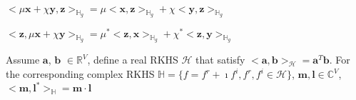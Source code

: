 \documentclass[12pt, draftclsnofoot, onecolumn]{IEEEtran}
\begin{document}
\begin{spacing}{2}
\begin{Property}
$<\mu\mathbf{x}+\chi\mathbf{y},\mathbf{z}>_{\mathbb{H}_{g}}=\mu<\mathbf{x},\mathbf{z}>_{\mathbb{H}_{g}}+\chi<\mathbf{y},\mathbf{z}>_{\mathbb{H}_{g}}$
\label{CHSProperty2}
\end{Property}

\begin{Property}
$<\mathbf{z}, \mu\mathbf{x}+\chi\mathbf{y}>_{\mathbb{H}_{g}}=\mu^{*}<\mathbf{z},\mathbf{x}>_{\mathbb{H}_{g}}+\chi^{*}<\mathbf{z}, \mathbf{y}>_{\mathbb{H}_{g}}$
\label{CHSProperty3}
\end{Property}

\begin{Lemma}
Assume $\mathbf{a}$, $\mathbf{b}$ $\in \mathbb{R}^{V}$, define a real RKHS $\mathcal{H}$ that satisfy $<\mathbf{a}, \mathbf{b}>_{\mathcal{H}}=\mathbf{a}^{T}\mathbf{b}$. For the corresponding complex RKHS $\mathbb{H}=\{f=f^{r}+\imath f^{i}, f^{r}, f^{i}\in \mathcal{H}\}$, $\mathbf{m}, \mathbf{l}\in \mathbb{C}^{V}$,
$<\mathbf{m},\mathbf{l}^{*}>_{\mathbb{H}}=\mathbf{m}\cdot \mathbf{l}$
\end{Lemma}    


\end{spacing}
\end{document}
